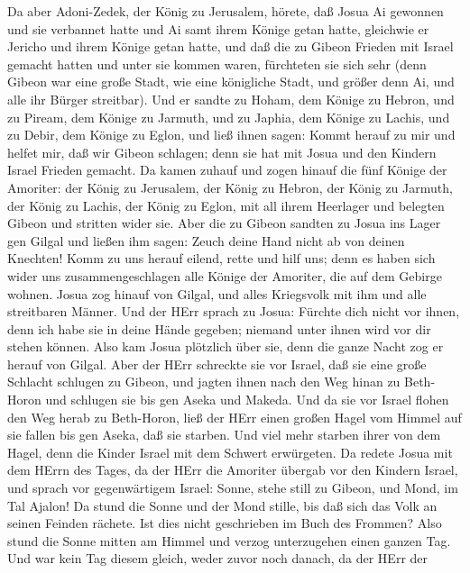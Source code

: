  Da aber Adoni-Zedek, der König zu Jerusalem, hörete, daß
Josua Ai gewonnen und sie verbannet hatte und Ai samt ihrem Könige getan
hatte, gleichwie er Jericho und ihrem Könige getan hatte, und daß die zu
Gibeon Frieden mit Israel gemacht hatten und unter sie kommen waren,
 fürchteten sie sich sehr (denn Gibeon war eine große Stadt,
wie eine königliche Stadt, und größer denn Ai, und alle ihr Bürger
streitbar).  Und er sandte zu Hoham, dem Könige zu Hebron,
und zu Piream, dem Könige zu Jarmuth, und zu Japhia, dem Könige zu
Lachis, und zu Debir, dem Könige zu Eglon, und ließ ihnen sagen:
 Kommt herauf zu mir und helfet mir, daß wir Gibeon
schlagen; denn sie hat mit Josua und den Kindern Israel Frieden gemacht.
 Da kamen zuhauf und zogen hinauf die fünf Könige der
Amoriter: der König zu Jerusalem, der König zu Hebron, der König zu
Jarmuth, der König zu Lachis, der König zu Eglon, mit all ihrem
Heerlager und belegten Gibeon und stritten wider sie.  Aber
die zu Gibeon sandten zu Josua ins Lager gen Gilgal und ließen ihm
sagen: Zeuch deine Hand nicht ab von deinen Knechten! Komm zu uns herauf
eilend, rette und hilf uns; denn es haben sich wider uns
zusammengeschlagen alle Könige der Amoriter, die auf dem Gebirge wohnen.
 Josua zog hinauf von Gilgal, und alles Kriegsvolk mit ihm
und alle streitbaren Männer.  Und der HErr sprach zu Josua:
Fürchte dich nicht vor ihnen, denn ich habe sie in deine Hände gegeben;
niemand unter ihnen wird vor dir stehen können.  Also kam
Josua plötzlich über sie, denn die ganze Nacht zog er herauf von Gilgal.
 Aber der HErr schreckte sie vor Israel, daß sie eine große
Schlacht schlugen zu Gibeon, und jagten ihnen nach den Weg hinan zu
Beth-Horon und schlugen sie bis gen Aseka und Makeda.  Und
da sie vor Israel flohen den Weg herab zu Beth-Horon, ließ der HErr
einen großen Hagel vom Himmel auf sie fallen bis gen Aseka, daß sie
starben. Und viel mehr starben ihrer von dem Hagel, denn die Kinder
Israel mit dem Schwert erwürgeten.  Da redete Josua mit dem
HErrn des Tages, da der HErr die Amoriter übergab vor den Kindern
Israel, und sprach vor gegenwärtigem Israel: Sonne, stehe still zu
Gibeon, und Mond, im Tal Ajalon!  Da stund die Sonne und
der Mond stille, bis daß sich das Volk an seinen Feinden rächete. Ist
dies nicht geschrieben im Buch des Frommen? Also stund die Sonne mitten
am Himmel und verzog unterzugehen einen ganzen Tag.  Und
war kein Tag diesem gleich, weder zuvor noch danach, da der HErr der
